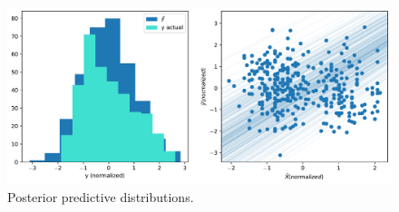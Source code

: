 \begin{figure}[H]
    \centering
    \includegraphics[width=0.8\linewidth]{data/05_reporting/problem_set_2/posterior_predictive.pdf}
    \caption{Posterior predictive distributions.}
    \label{fig:posterior-predictive}
\end{figure}


